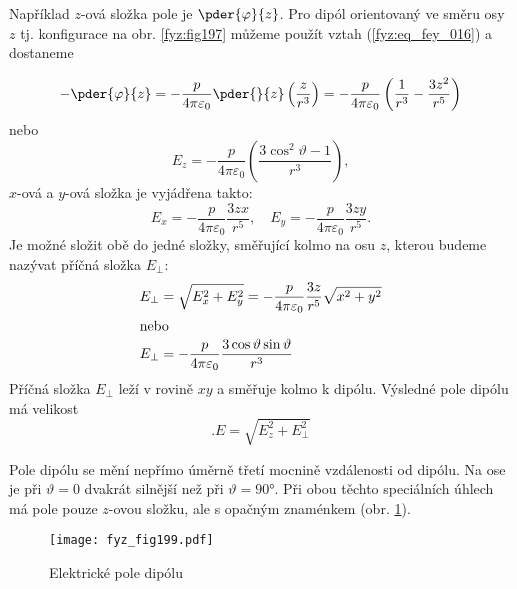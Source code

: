   Například \(z\)-ová složka pole je \(\pder{\varphi}{z}\). Pro dipól orientovaný ve směru osy \(z\)
  tj. konfigurace na obr. \ref{fyz:fig197} můžeme použít vztah (\ref{fyz:eq_fey_016}) a dostaneme
  
  \begin{equation}\label{fyz:eq_fey_021}
  -\pder{\varphi}{z}
     = - \frac{p}{4\pi\varepsilon_0}\pder{}{z}\left(\dfrac{z}{r^3}\right)
     = - \frac{p}{4\pi\varepsilon_0}\left(\frac{1}{r^3}-\dfrac{3z^2}{r^5}\right) 
  \end{equation}
  nebo
  \begin{equation}\label{fyz:eq_fey_022}
    E_z = - \frac{p}{4\pi\varepsilon_0}\left(\dfrac{3\cos^2\vartheta-1}{r^3}\right),
  \end{equation}
  \(x\)-ová a \(y\)-ová složka je vyjádřena takto:
  \begin{equation}\label{fyz:eq_fey_023}
    E_x = - \frac{p}{4\pi\varepsilon_0}\dfrac{3zx}{r^5}, \quad
    E_y = - \frac{p}{4\pi\varepsilon_0}\dfrac{3zy}{r^5}.
  \end{equation}
  Je možné složit obě do jedné složky, směřující kolmo na osu \(z\), kterou budeme nazývat příčná
  složka \(E_\perp\):
  \begin{align}
    E_\perp &= \sqrt{E_x^2 + E_y^2} 
             = - \frac{p}{4\pi\varepsilon_0}\dfrac{3z}{r^5}\sqrt{x^2+y^2} \nonumber \\
    \shortintertext{nebo}
    E_\perp &= - \frac{p}{4\pi\varepsilon_0}\dfrac{3\cos\vartheta\sin\vartheta}{r^3} 
                                                                         \label{fyz:eq_fey_024}
  \end{align}
  Příčná složka \(E_\perp\) leží v rovině \(xy\) a směřuje kolmo k dipólu. Výsledné pole dipólu má
  velikost
  \begin{equation}\label{fyz:eq_fey_025}.
    E = \sqrt{E_z^2 + E_\perp^2} 
  \end{equation}
  
  Pole dipólu se mění nepřímo úměrně třetí mocnině vzdálenosti od dipólu. Na ose je při \(\vartheta=
  0\) dvakrát silnější než při \(\vartheta=\ang{90}\). Při obou těchto speciálních úhlech má pole
  pouze \(z\)-ovou složku, ale s opačným znaménkem (obr. \ref{fyz:fig199}).
  \begin{figure}[ht!]
    \centering
    \texttt{[image: fyz\_fig199.pdf]}
    \caption{Elektrické pole dipólu}
    \label{fyz:fig199}
  \end{figure}


